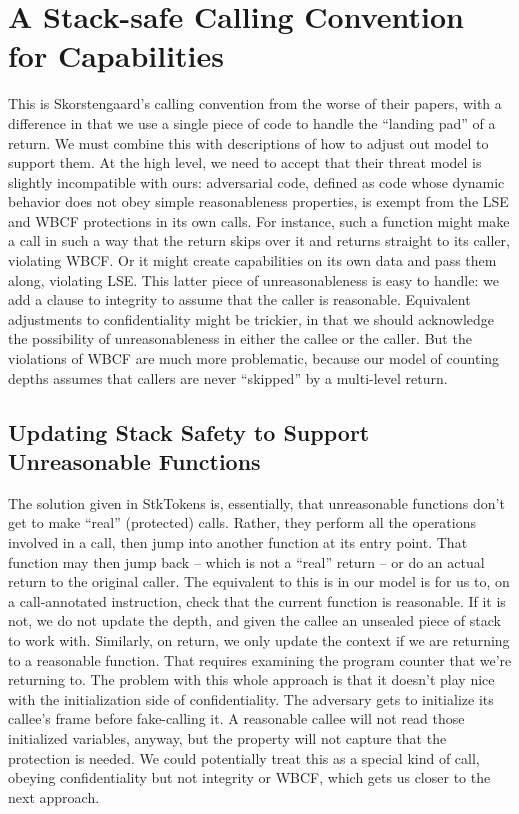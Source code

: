 \documentclass{article}
\begin{document}
\section{A Stack-safe Calling Convention for Capabilities}

This is Skorstengaard's calling convention from the worse of their papers, with a
difference in that we use a single piece of code to handle the ``landing pad'' of a return.
We must combine this with descriptions of how to adjust out model to support them. At the
high level, we need to accept that their threat model is slightly incompatible with ours:
adversarial code, defined as code whose dynamic behavior does not obey simple reasonableness
properties, is exempt from the LSE and WBCF protections in its own calls. For instance, such
a function might make a call in such a way that the return skips over it and returns straight
to its caller, violating WBCF. Or it might create capabilities on its own data and pass them
along, violating LSE. This latter piece of unreasonableness is easy to handle: we add a clause
to integrity to assume that the caller is reasonable. Equivalent adjustments to confidentiality
might be trickier, in that we should acknowledge the possibility of unreasonableness in either
the callee or the caller. But the violations of WBCF are much more problematic, because our
model of counting depths assumes that callers are never ``skipped'' by a multi-level return.

\subsection{Updating Stack Safety to Support Unreasonable Functions}

The solution given in StkTokens is, essentially, that unreasonable functions don't get to
make ``real'' (protected) calls. Rather, they perform all the operations involved in a call,
then jump into another function at its entry point. That function may then jump back -- which
is not a ``real'' return -- or do an actual return to the original caller. The equivalent to
this is in our model is for us to, on a call-annotated instruction, check that the current
function is reasonable. If it is not, we do not update the depth, and given the callee an
unsealed piece of stack to work with. Similarly, on return, we only update the context
if we are returning to a reasonable function. That requires examining the program counter
that we're returning to. The problem with this whole approach is that it doesn't play nice
with the initialization side of confidentiality. The adversary gets to initialize its
callee's frame before fake-calling it. A reasonable callee will not read those initialized
variables, anyway, but the property will not capture that the protection is needed. We
could potentially treat this as a special kind of call, obeying confidentiality but not
integrity or WBCF, which gets us closer to the next approach.
\end{document}
